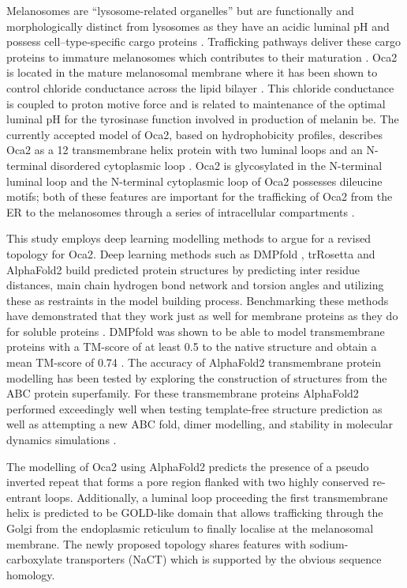Melanosomes are “lysosome-related organelles” but are functionally and morphologically distinct from lysosomes as they have an acidic luminal pH \cite{griffiths2002s} and possess cell–type-specific cargo proteins \cite{raposo2007lysosome}.  Trafficking pathways deliver these cargo proteins to immature melanosomes which contributes to their maturation \cite{raposo2007melanosomes}. Oca2 is located in the mature melanosomal membrane where it has been shown to control chloride conductance across the lipid bilayer \cite{bellono2014intracellular}. This chloride conductance is coupled to proton motive force and is related to maintenance of the optimal luminal pH for the tyrosinase function involved in production of melanin \cite{bellono2014intracellular} be. The currently accepted model of Oca2, based on hydrophobicity profiles, describes Oca2 as a 12 transmembrane helix protein with two luminal loops and an N-terminal disordered cytoplasmic loop \cite{gardner1992mouse}. Oca2 is glycosylated in the N-terminal luminal loop and the N-terminal cytoplasmic loop of Oca2 possesses dileucine motifs; both of these features are important for the trafficking of Oca2 from the ER to the melanosomes through a series of intracellular compartments \cite{sitaram2009localization}.

This study employs deep learning modelling methods to argue for a revised topology for Oca2.  Deep learning methods such as DMPfold \cite{Greener2019}, trRosetta \cite{Yang2020} and AlphaFold2 \cite{Jumper2021} build predicted protein structures by predicting inter residue distances, main chain hydrogen bond network and torsion angles and utilizing these as restraints in the model building process. Benchmarking these methods have demonstrated that they work just as well for membrane proteins as they do for soluble proteins \cite{Greener2019,hegedHus2021alphafold2}. DMPfold was shown to be able to model transmembrane proteins with a TM-score of at least 0.5 to the native structure and obtain a mean TM-score of 0.74 \cite{Greener2019}. The accuracy of AlphaFold2 transmembrane protein modelling has been tested by exploring the construction of structures from the ABC protein superfamily. For these transmembrane proteins AlphaFold2 performed exceedingly well when testing template-free structure prediction as well as attempting a new ABC fold, dimer modelling, and stability in molecular dynamics simulations \cite{hegedHus2022ins}.

The modelling of Oca2 using AlphaFold2 predicts the presence of a pseudo inverted repeat that forms a pore region flanked with two highly conserved re-entrant loops.  Additionally, a luminal loop proceeding the first transmembrane helix is predicted to be GOLD-like domain that allows trafficking through the Golgi from the endoplasmic reticulum to finally localise at the melanosomal membrane. The newly proposed topology shares features with sodium-carboxylate transporters (NaCT) which is supported by the obvious sequence homology.  

